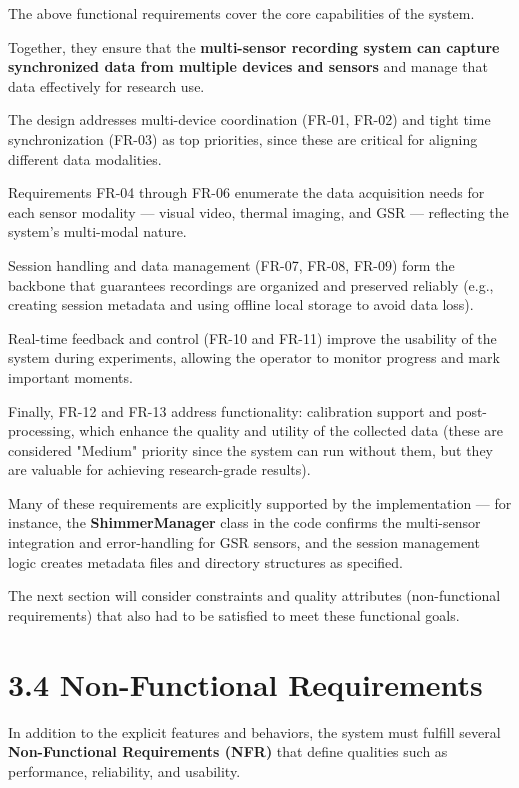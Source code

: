 The above functional requirements cover the core capabilities of the system.

Together, they ensure that the \textbf{multi-sensor recording system can capture
synchronized data from multiple devices and sensors}
 and manage that data effectively for research use.

The design addresses multi-device coordination (FR-01, FR-02) and tight time
synchronization (FR-03) as top priorities, since these are critical for aligning
different data modalities.

Requirements FR-04 through FR-06 enumerate the data acquisition needs for each sensor
modality --- visual video, thermal imaging, and GSR --- reflecting the system's
multi-modal nature.

Session handling and data management (FR-07, FR-08, FR-09) form the backbone that
guarantees recordings are organized and preserved reliably (e.g., creating session
metadata and using offline local storage to avoid data loss).

Real-time feedback and control (FR-10 and FR-11) improve the usability of the system
during experiments, allowing the operator to monitor progress and mark important
moments.

Finally, FR-12 and FR-13 address functionality: calibration support and
post-processing, which enhance the quality and utility of the collected data (these
are considered "Medium" priority since the system can run without them, but they are
valuable for achieving research-grade results).

Many of these requirements are explicitly supported by the implementation --- for
instance, the \textbf{ShimmerManager}
 class in the code confirms the multi-sensor integration and error-handling for GSR
 sensors, and the session management logic creates metadata files and directory
 structures as specified.

The next section will consider constraints and quality attributes (non-functional
requirements) that also had to be satisfied to meet these functional goals.

\section{3.4 Non-Functional Requirements}

In addition to the explicit features and behaviors, the system must fulfill several
\textbf{Non-Functional Requirements (NFR)}
 that define qualities such as performance, reliability, and usability.

